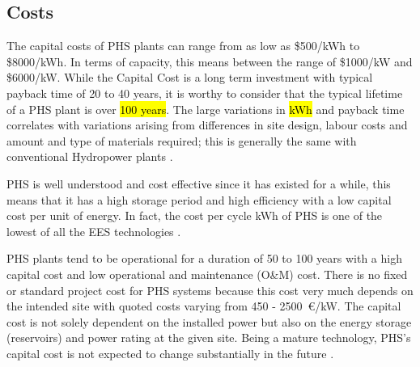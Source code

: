 
\subsection{Costs}

The capital costs of PHS plants can range from as low as \$500/kWh to \$8000/kWh. In terms of capacity, this means between the range of \$1000/kW and
\$6000/kW. While the Capital Cost is a long term investment with typical
payback time of 20 to 40 years, it is worthy to consider that the typical
lifetime of a PHS plant is over \hl{100 years}. The large variations in \hl{kWh} and
payback time correlates with variations arising from differences in site
design, labour costs and amount and type of materials required; this is
generally the same with conventional Hydropower plants
\citep{Kocher-Oberlehner2014}.

PHS is well understood and cost effective since it has existed for a
while\citep{ESMStudy2010, Ramirez2016}, this means that it has a high storage
period and high efficiency with a low capital cost per unit of energy.  In
fact, the cost per cycle kWh of PHS is one of the lowest of all the EES
technologies \citep{Chen2009}.



%


PHS plants tend to be operational for a duration of 50 to 100 years with a
high capital cost and low operational and maintenance (O\&M) cost. There is no
fixed or standard project cost for PHS systems because this cost very much
depends on the intended site with quoted costs varying from 450 - 2500~\euro{}/kW.  The capital cost is not solely dependent on the installed power but
also on the energy storage (reservoirs) and power rating at the given site.
Being a mature technology, PHS's capital cost is not expected to change
substantially in the future \citep{Zach2012}.

